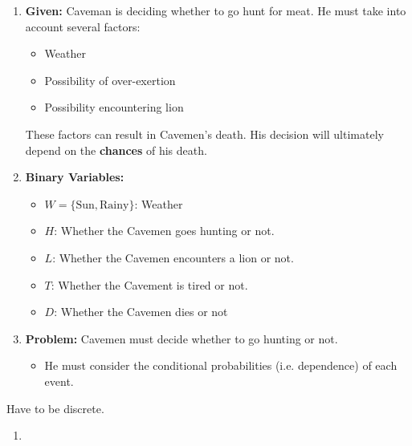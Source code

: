 \begin{example}
    \begin{enumerate}
        \item \textbf{Given:} Caveman is deciding whether to go hunt for meat. He must take into account several factors:
        \begin{itemize}
            \item Weather
            \item Possibility of over-exertion
            \item Possibility encountering lion
        \end{itemize}

        These factors can result in Cavemen's death. His decision will ultimately depend on the \textbf{chances} of his death.
        \item \textbf{Binary Variables:}
        \begin{itemize}
            \item $W = \{\text{Sun}, \text{Rainy}\}$: Weather
            \item $H$: Whether the Cavemen goes hunting or not.
            \item $L$: Whether the Cavemen encounters a lion or not.
            \item $T$: Whether the Cavement is tired or not.
            \item $D$: Whether the Cavemen dies or not
        \end{itemize}
        \item \textbf{Problem:} Cavemen must decide whether to go hunting or not. 
        \begin{itemize}
            \item He must consider the conditional probabilities (i.e. dependence) of each event.
        \end{itemize}
    \end{enumerate}
\end{example}

\begin{warning}
    Have to be discrete. 
\end{warning}
\newpage

\begin{process}
    \begin{enumerate}
        \item 
    \end{enumerate}
\end{process}

